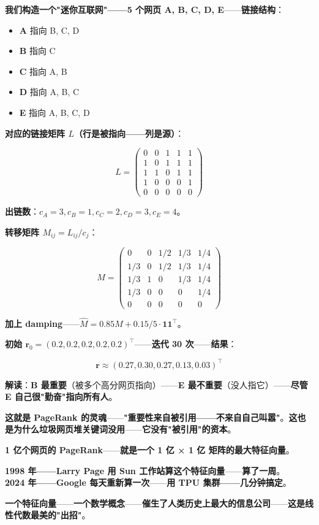 \textbf{我们构造一个"迷你互联网"——5 个网页 A, B, C, D, E}——\textbf{链接结构}：

\begin{itemize}
\item \textbf{A} 指向 B, C, D
\item \textbf{B} 指向 C
\item \textbf{C} 指向 A, B
\item \textbf{D} 指向 A, B, C
\item \textbf{E} 指向 A, B, C, D
\end{itemize}

\textbf{对应的链接矩阵 $L$（行是被指向——列是源）}：

\[
L = \begin{pmatrix}
0 & 0 & 1 & 1 & 1 \\
1 & 0 & 1 & 1 & 1 \\
1 & 1 & 0 & 1 & 1 \\
1 & 0 & 0 & 0 & 1 \\
0 & 0 & 0 & 0 & 0
\end{pmatrix}
\]

\textbf{出链数}：\textbf{$c_A = 3, c_B = 1, c_C = 2, c_D = 3, c_E = 4$}。

\textbf{转移矩阵 $M_{ij} = L_{ij} / c_j$}：

\[
M = \begin{pmatrix}
0 & 0 & 1/2 & 1/3 & 1/4 \\
1/3 & 0 & 1/2 & 1/3 & 1/4 \\
1/3 & 1 & 0 & 1/3 & 1/4 \\
1/3 & 0 & 0 & 0 & 1/4 \\
0 & 0 & 0 & 0 & 0
\end{pmatrix}
\]

\textbf{加上 damping}——\textbf{$\hat{M} = 0.85 M + 0.15/5 \cdot \bm{1} \bm{1}^{\!\top}$}。

\textbf{初始 $\bm{r}_0 = (0.2, 0.2, 0.2, 0.2, 0.2)^{\!\top}$}——\textbf{迭代 30 次}——\textbf{结果}：

\[
\bm{r} \approx (0.27, 0.30, 0.27, 0.13, 0.03)^{\!\top}
\]

\textbf{解读}：\textbf{B 最重要}（被多个高分网页指向）——\textbf{E 最不重要}（没人指它）——\textbf{尽管 E 自己很"勤奋"指向所有人}。

\textbf{这就是 PageRank 的灵魂}——\textbf{"重要性来自被引用——不来自自己叫嚣"}。\textbf{这也是为什么垃圾网页堆关键词没用}——\textbf{它没有"被引用"的资本}。

\begin{tcolorbox}[ahabox={\Large Aha：PageRank = 互联网的特征向量}]
\textbf{1 亿个网页的 PageRank}——\textbf{就是一个 1 亿 × 1 亿 矩阵的最大特征向量}。

\medskip

\textbf{1998 年——Larry Page 用 Sun 工作站算这个特征向量}——\textbf{算了一周}。\\
\textbf{2024 年——Google 每天重新算一次}——\textbf{用 TPU 集群——几分钟搞定}。

\medskip

\textbf{一个特征向量}——\textbf{一个数学概念}——\textbf{催生了人类历史上最大的信息公司}——\textbf{这是线性代数最美的"出招"}。
\end{tcolorbox}

